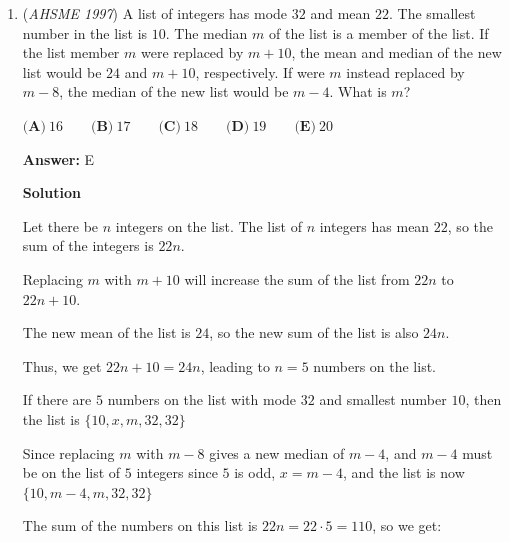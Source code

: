 \begin{enumerate}
\textbf{Solution}

Since the line $x=k$ is vertical, we are only concerned with vertical distance.

 In other words, we want to find the value of $k$ for which the distance $|\log_5 x - \log_5 (x+4)| = \frac{1}{2}$

 Since $\log_5 x$ is a strictly increasing function, we have:

 $\log_5 (x + 4) - \log_5 x = \frac{1}{2}$
$\log_5 (\frac{x+4}{x}) = \frac{1}{2}$
$\frac{x+4}{x} = 5^\frac{1}{2}$
$x + 4 = x\sqrt{5}$
$x\sqrt{5} - x = 4$
$x = \frac{4}{\sqrt{5} - 1}$
$x = \frac{4(\sqrt{5} + 1)}{5 - 1^2}$
$x = 1 + \sqrt{5}$

 The desired quantity is $1 + 5 = 6$, and the answer is $\boxed{A}$.

 


	\item (\textit{AHSME 1997}) A list of integers has mode $32$ and mean $22$. The smallest number in the list is $10$. The median $m$ of the list is a member of the list. If the list member $m$ were replaced by $m+10$, the mean and median of the new list would be $24$ and $m+10$, respectively. If were $m$ instead replaced by $m-8$, the median of the new list would be $m-4$. What is $m$?


 $\textbf{(A)}\ 16\qquad\textbf{(B)}\ 17\qquad\textbf{(C)}\ 18\qquad\textbf{(D)}\ 19\qquad\textbf{(E)}\ 20$

 \textbf{Answer: }E



\textbf{Solution}

Let there be $n$ integers on the list.  The list of $n$ integers has mean $22$, so the sum of the integers is $22n$.

 Replacing $m$ with $m+10$ will increase the sum of the list from $22n$ to $22n + 10$.

 The new mean of the list is $24$, so the new sum of the list is also $24n$.

 Thus, we get $22n + 10 = 24n$, leading to $n=5$ numbers on the list.

 If there are $5$ numbers on the list with mode $32$ and smallest number $10$, then the list is $\{10, x, m, 32, 32\}$

 Since replacing $m$ with $m-8$ gives a new median of $m-4$, and $m-4$ must be on the list of $5$ integers since $5$ is odd, $x = m-4$, and the list is now $\{10, m-4, m, 32, 32\}$

 The sum of the numbers on this list is $22n = 22\cdot 5 = 110$, so we get:


\end{enumerate}
